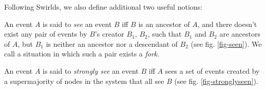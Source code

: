 \documentclass[a4paper,fleqn]{article}
\begin{document}
Following Swirlds\cite{hg}, we also define additional two useful notions:

\begin{defn}
	An event $A$ is said to \emph{see} an event $B$ iff $B$ is an ancestor of $A$, and there
	doesn't exist any pair of events by $B$'s creator $B_1$, $B_2$, such that $B_1$ and $B_2$ are
	ancestors of $A$, but $B_1$ is neither an ancestor nor a descendant of $B_2$ (see fig.
	\ref{fig-seen}). We call a situation in which such a pair exists a \emph{fork}.
\end{defn}

\begin{defn}
	An event $A$ is said to \emph{strongly see} an event $B$ iff $A$ sees a set of events created
	by a supermajority of nodes in the system that all see $B$ (see fig. \ref{fig-stronglyseen}).
\end{defn}

\begin{figure}[!ht]
	\centering
	\begin{floatrow}
	\end{floatrow}
\end{figure}
\end{document}
